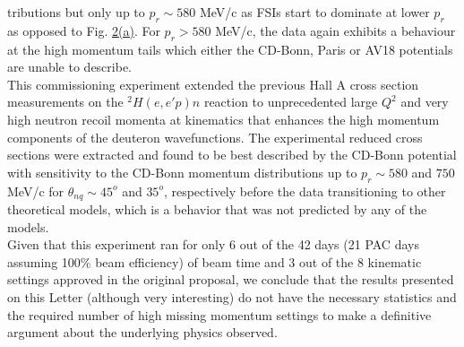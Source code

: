 \twocolumngrid
\noindent tributions but only up to $p_{r}\sim 580$ MeV/c as FSIs start to dominate at lower $p_{r}$ as opposed to Fig. \hyperref[fig:fig2]{2(a)}.
For $p_{r}>580$ MeV/c, the data again exhibits a behaviour at the high momentum tails which either the CD-Bonn, Paris or AV18 potentials are unable to describe.\\
\indent This commissioning experiment extended the previous Hall A cross section measurements on the $^{2}H(e,e'p)n$ reaction to 
unprecedented large $Q^{2}$ and very high neutron recoil momenta at kinematics that enhances the high momentum components of the deuteron wavefunctions.
The experimental reduced cross sections were extracted and found to be best described by the CD-Bonn potential with sensitivity to the CD-Bonn momentum distributions
up to $p_{r}\sim580$ and $750$ MeV/c for $\theta_{nq}\sim45^{o}$ and $35^{o}$, respectively before the data transitioning to other theoretical models, which is a
behavior that was not predicted by any of the models. \\
\indent Given that this experiment ran for only 6 out of the 42 days (21 PAC days assuming 100$\%$ beam efficiency) of beam time and 3 out of the 8 kinematic settings approved in
the original proposal\cite{e12_10_003_proposal}, we conclude that the results presented on this Letter (although very interesting) do not have the
necessary statistics and the required number of high missing momentum settings to make a definitive argument about the underlying physics observed.




